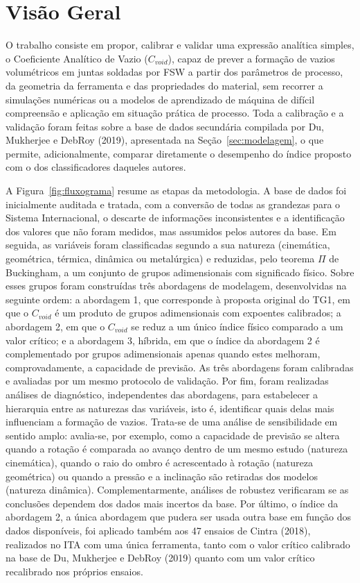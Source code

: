 \documentclass[12pt,openany]{report}
\begin{document}
\section{Visão Geral}
\label{sec:visao_geral}

O trabalho consiste em propor, calibrar e validar uma expressão analítica simples, o Coeficiente Analítico de Vazio ($C_{void}$), capaz de prever a formação de vazios volumétricos em juntas soldadas por FSW a partir dos parâmetros de processo, da geometria da ferramenta e das propriedades do material, sem recorrer a simulações numéricas ou a modelos de aprendizado de máquina de difícil compreensão e aplicação em situação prática de processo. Toda a calibração e a validação foram feitas sobre a base de dados secundária compilada por Du, Mukherjee e DebRoy (2019), apresentada na Seção~\ref{sec:modelagem}, o que permite, adicionalmente, comparar diretamente o desempenho do índice proposto com o dos classificadores daqueles autores.

A Figura~\ref{fig:fluxograma} resume as etapas da metodologia. A base de dados foi inicialmente auditada e tratada, com a conversão de todas as grandezas para o Sistema Internacional, o descarte de informações inconsistentes e a identificação dos valores que não foram medidos, mas assumidos pelos autores da base. Em seguida, as variáveis foram classificadas segundo a sua natureza (cinemática, geométrica, térmica, dinâmica ou metalúrgica) e reduzidas, pelo teorema $\Pi$ de Buckingham, a um conjunto de grupos adimensionais com significado físico. Sobre esses grupos foram construídas três abordagens de modelagem, desenvolvidas na seguinte ordem: a abordagem 1, que corresponde à proposta original do TG1, em que o $C_{void}$ é um produto de grupos adimensionais com expoentes calibrados; a abordagem 2, em que o $C_{void}$ se reduz a um único índice físico comparado a um valor crítico; e a abordagem 3, híbrida, em que o índice da abordagem 2 é complementado por grupos adimensionais apenas quando estes melhoram, comprovadamente, a capacidade de previsão. As três abordagens foram calibradas e avaliadas por um mesmo protocolo de validação. Por fim, foram realizadas análises de diagnóstico, independentes das abordagens, para estabelecer a hierarquia entre as naturezas das variáveis, isto é, identificar quais delas mais influenciam a formação de vazios. Trata-se de uma análise de sensibilidade em sentido amplo: avalia-se, por exemplo, como a capacidade de previsão se altera quando a rotação é comparada ao avanço dentro de um mesmo estudo (natureza cinemática), quando o raio do ombro é acrescentado à rotação (natureza geométrica) ou quando a pressão e a inclinação são retiradas dos modelos (natureza dinâmica). Complementarmente, análises de robustez verificaram se as conclusões dependem dos dados mais incertos da base. Por último, o índice da abordagem 2, a única abordagem que pudera ser usada outra base em função dos dados disponíveis, foi aplicado também aos 47 ensaios de Cintra (2018), realizados no ITA com uma única ferramenta, tanto com o valor crítico calibrado na base de Du, Mukherjee e DebRoy (2019) quanto com um valor crítico recalibrado nos próprios ensaios.
\end{document}
